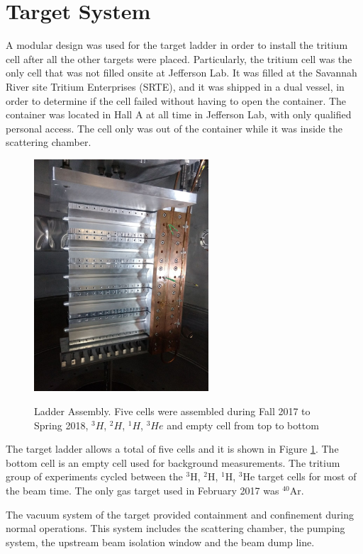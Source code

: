 \documentclass[final,5p,times,twocolumn,balance]{elsarticle}
\begin{document}
\section{Target System}

A modular design was used for the target ladder in order to install the tritium cell after all the other targets were placed. 
Particularly, the tritium cell was the only cell that was not filled onsite at Jefferson Lab. It was filled at the Savannah River 
site Tritium Enterprises (SRTE), and it was shipped in a dual vessel, in order  to determine if the cell failed without having to
open the container. The container was located in Hall A at all time in Jefferson Lab, with only qualified personal access. The cell only was out of the container while it was inside the scattering chamber. 

\begin{figure}[htbp]
\centering
  \includegraphics[width=6.5cm]{images/ladder.jpg}\\
  \caption{Ladder Assembly. Five cells were assembled during Fall 2017 to Spring 2018, $^{3}H$, $^{2}H$, $^{1}H $, $^{3}He$ and empty cell from top to bottom
 }\label{ladder}
\end{figure}

The target ladder allows a total of five cells and it is shown in Figure \ref{ladder}.  The bottom cell is an empty cell used for background measurements. The tritium group of experiments cycled between the $^{3}$H, $^{2}$H, $^{1}$H, $^{3}$He target cells for most of the beam time. The only gas target used in February 2017 was $^{40}$Ar.

The vacuum system of the target provided containment and confinement during normal operations. This system includes the scattering chamber, 
the pumping system, the upstream beam isolation window and the beam dump line.  
\end{document}

